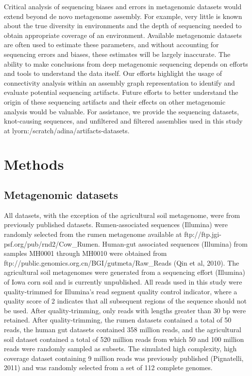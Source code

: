 \documentclass[11pt]{article} %
\begin{document}
	Critical analysis of sequencing biases and errors in metagenomic datasets would extend beyond de novo metagenome assembly.  For example, very little is known about the true diversity in environments and the depth of sequencing needed to obtain appropriate coverage of an environment.  Available metagenomic datasets are often used to estimate these parameters, and without accounting for sequencing errors and biases, these estimates will be largely inaccurate.  The ability to make conclusions from deep metagenomic sequencing depends on efforts and tools to understand the data itself.  Our efforts highlight the usage of connectivity analysis within an assembly graph representation to identify and evaluate potential sequencing artifacts.  Future efforts to better understand the origin of these sequencing artifacts and their effects on other metagenomic analysis would be valuable.  For assistance, we provide the sequencing datasets, knot-causing sequences, and unfiltered and filtered assemblies used in this study at lyorn:/scratch/adina/artifacts-datasets.
	



\section{Methods}

\subsection{Metagenomic datasets}

All datasets, with the exception of the agricultural soil metagenome, were from previously published datasets. Rumen-associated sequences (Illumina) were randomly selected from the rumen metagenome available at ftp://ftp.jgi-psf.org/pub/rnd2/Cow\_Rumen. Human-gut associated sequences (Illumina) from samples MH0001 through MH0010 were obtained from ftp://public.genomics.org.cn/BGI/gutmeta/Raw\_Reads (Qin et al, 2010). The agricultural soil metagenomes were generated from a sequencing effort (Illumina) of Iowa corn soil and is currently unpublished. All reads used in this study were quality-trimmed for Illumina's read segment quality control indicator, where a quality score of 2 indicates that all subsequent regions of the sequence should not be used. After quality-trimming, only reads with lengths greater than 30 bp were retained. After quality-trimming, the rumen datasets contained a total of 50 reads, the human gut datasets contained 358 million reads, and the agricultural soil dataset contained a total of 520 million reads from which 50 and 100 million reads were randomly sampled as subsets. The simulated high complexity, high coverage dataset containing 9 million reads was previously published (Pignatelli, 2011) and was randomly selected from a set of 112 complete genomes.
\end{document}
